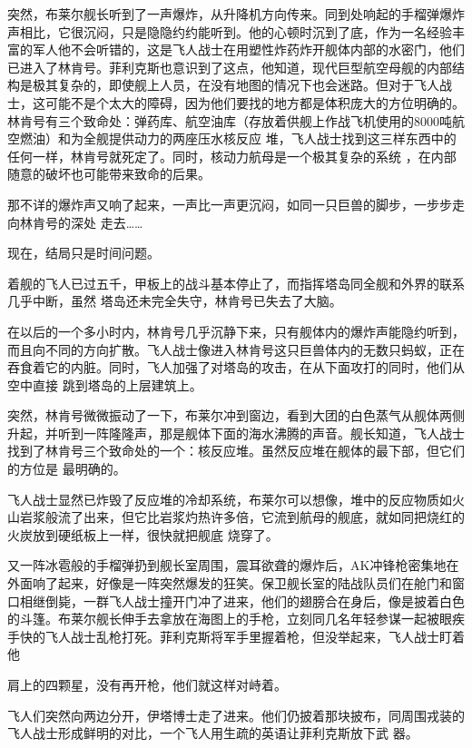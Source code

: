 \documentclass{article}
\begin{document}
突然，布莱尔舰长听到了一声爆炸，从升降机方向传来。同到处响起的手榴弹爆炸声相比，它很沉闷，只是隐隐约约能听到。他的心顿时沉到了底，作为一名经验丰富的军人他不会听错的，这是飞人战士在用塑性炸药炸开舰体内部的水密门，他们已进入了林肯号。菲利克斯也意识到了这点，他知道，现代巨型航空母舰的内部结构是极其复杂的，即使舰上人员，在没有地图的情况下也会迷路。但对于飞人战士，这可能不是个太大的障碍，因为他们要找的地方都是体积庞大的方位明确的。林肯号有三个致命处：弹药库、航空油库（存放着供舰上作战飞机使用的8000吨航空燃油）和为全舰提供动力的两座压水核反应
\newpage
堆，飞人战士找到这三样东西中的任何一样，林肯号就死定了。同时，核动力航母是一个极其复杂的系统
，在内部随意的破坏也可能带来致命的后果。 

那不详的爆炸声又响了起来，一声比一声更沉闷，如同一只巨兽的脚步，一步步走向林肯号的深处
走去…… 


现在，结局只是时间问题。 

着舰的飞人已过五千，甲板上的战斗基本停止了，而指挥塔岛同全舰和外界的联系几乎中断，虽然
塔岛还未完全失守，林肯号已失去了大脑。 

在以后的一个多小时内，林肯号几乎沉静下来，只有舰体内的爆炸声能隐约听到，而且向不同的方向扩散。飞人战士像进入林肯号这只巨兽体内的无数只蚂蚁，正在吞食着它的内脏。同时，飞人加强了对塔岛的攻击，在从下面攻打的同时，他们从空中直接
跳到塔岛的上层建筑上。 

\newpage

突然，林肯号微微振动了一下，布莱尔冲到窗边，看到大团的白色蒸气从舰体两侧升起，并听到一阵隆隆声，那是舰体下面的海水沸腾的声音。舰长知道，飞人战士找到了林肯号三个致命处的一个：核反应堆。虽然反应堆在舰体的最下部，但它们的方位是
最明确的。 

飞人战士显然已炸毁了反应堆的冷却系统，布莱尔可以想像，堆中的反应物质如火山岩浆般流了出来，但它比岩浆灼热许多倍，它流到航母的舰底，就如同把烧红的火炭放到硬纸板上一样，很快就把舰底
烧穿了。 

又一阵冰雹般的手榴弹扔到舰长室周围，震耳欲聋的爆炸后，AK冲锋枪密集地在外面响了起来，好像是一阵突然爆发的狂笑。保卫舰长室的陆战队员们在舱门和窗口相继倒毙，一群飞人战士撞开门冲了进来，他们的翅膀合在身后，像是披着白色的斗篷。布莱尔舰长伸手去拿放在海图上的手枪，立刻同几名年轻参谋一起被眼疾手快的飞人战士乱枪打死。菲利克斯将军手里握着枪，但没举起来，飞人战士盯着他
\newpage

肩上的四颗星，没有再开枪，他们就这样对峙着。 

飞人们突然向两边分开，伊塔博士走了进来。他们仍披着那块披布，同周围戎装的飞人战士形成鲜明的对比，一个飞人用生疏的英语让菲利克斯放下武
器。 
\end{document}
